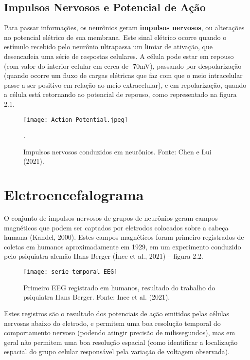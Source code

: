 \subsection{Impulsos Nervosos e Potencial de Ação}
Para passar informações, os neurônios geram \textbf{impulsos nervosos}, ou alterações no potencial elétrico de sua membrana. Este sinal elétrico
ocorre quando o estímulo recebido pelo neurônio ultrapassa um limiar de ativação, que desencadeia uma série de respostas celulares. A célula pode 
estar em repouso (com valor do interior celular em cerca de -70mV), passando por despolarização (quando ocorre um fluxo de cargas elétricas que faz com 
que o meio intracelular passe a ser positivo em relação ao meio extracelular), e em repolarização, quando a célula está retornando ao potencial de repouso,
como representado na figura 2.1. 

\begin{figure}[h]
    \centering
    \texttt{[image: Action\_Potential.jpeg]}
    \caption[Impulsos nervosos conduzidos em neurônios]{Impulsos nervosos conduzidos em neurônios. Fonte: Chen e Lui (2021).}.\label{fig:potencial}
    \end{figure}

\section{Eletroencefalograma}
O conjunto de impulsos nervosos de grupos de neurônios geram campos magnéticos
 que podem ser captados por eletrodos colocados sobre a cabeça humana (Kandel, 2000). 
 Estes campos magnéticos foram primeiro registrados de coletas em humanos aproximadamente em 1929,
  em um experimento conduzido pelo psiquiatra alemão Hans Berger (İnce et al., 2021) – figura 2.2. 
  \begin{figure}[h]
    \centering
    \texttt{[image: serie\_temporal\_EEG]}
    \caption[]{Primeiro EEG registrado em humanos, resultado do trabalho do psiquiatra Hans Berger. Fonte: Ince et al. (2021).} 
    \end{figure}


  Estes registros são o resultado dos potenciais de ação emitidos pelas células nervosas abaixo do eletrodo, 
  e permitem uma boa resolução temporal do comportamento nervoso (podendo atingir precisão de milissegundos), 
  mas em geral não permitem uma boa resolução espacial (como identificar a localização espacial do grupo celular responsável pela variação de voltagem observada). 



